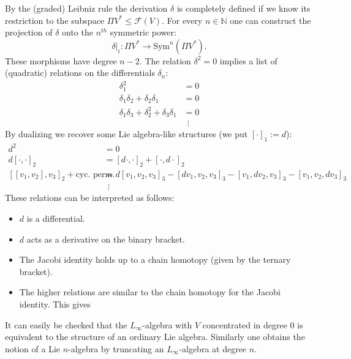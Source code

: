     By the (graded) Leibniz rule the derivation $\delta$ is completely defined if we know its restriction to the subspace $\Pi V^*\leq\mathcal{F}(V)$. For every $n\in\mathbb{N}$ one can construct the projection of $\delta$ onto the $n^{th}$ symmetric power: \[\delta|_i:\Pi V^*\rightarrow\text{Sym}^n(\Pi V^*).\] These morphisms have degree $n-2$. The relation $\delta^2=0$ implies a list of (quadratic) relations on the differentials $\delta_n$:
    \begin{align*}
        \delta_1^2 &= 0\\
        \delta_1\delta_2+\delta_2\delta_1 &= 0\\
        \delta_1\delta_3+\delta_2^2+\delta_3\delta_1 &= 0\\
        &\ \ \vdots
    \end{align*}
    By dualizing we recover some Lie algebra-like structures (we put $[\cdot]_1:=d$):
    \begin{align*}
        d^2&=0\\
        d[\cdot,\cdot]_2 &= [d\cdot,\cdot]_2+[\cdot,d\cdot]_2\\
        [[v_1,v_2],v_3]_2+\text{cyc. perm.} &= d[v_1,v_2,v_3]_3-[dv_1,v_2,v_3]_3-[v_1,dv_2,v_3]_3-[v_1,v_2,dv_3]_3\\
        &\ \ \vdots
    \end{align*}
    These relations can be interpreted as follows:
    \begin{itemize}
        \item $d$ is a differential.
        \item $d$ acts as a derivative on the binary bracket.
        \item The Jacobi identity holds up to a chain homotopy (given by the ternary bracket).
        \item The higher relations are similar to the chain homotopy for the Jacobi identity. This gives
    \end{itemize}


    \begin{example}
        It can easily be checked that the $L_\infty$-algebra with $V$ concentrated in degree 0 is equivalent to the structure of an ordinary Lie algebra. Similarly one obtains the notion of a Lie $n$-algebra by truncating an $L_\infty$-algebra at degree $n$.
    \end{example}
